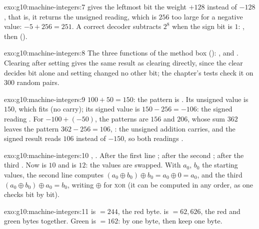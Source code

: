 \begin{solution}{exo:g10:machine-integers:7}
 gives the leftmost bit the weight $+128$ instead of $-128$, that is, it returns the unsigned
reading, which is $256$ too large for a negative value: $-5 + 256 = 251$. A correct decoder subtracts $2^8$ when the
sign bit is $1$: , then 
().
\end{solution}

\begin{solution}{exo:g10:machine-integers:8}
The three functions of the method box (): ,  and
. Clearing after setting gives the same result as clearing directly, since the clear decides bit
 alone and setting changed no other bit; the chapter's tests check it on $300$ random pairs.
\end{solution}

\begin{solution}{exo:g10:machine-integers:9}
$100 + 50 = 150$: the pattern is . Its unsigned value is $150$, which fits (no carry); its signed
value is $150 - 256 = -106$: the signed reading . For $-100 + (-50)$, the patterns are $156$ and $206$, whose
sum $362$ leaves the pattern $362 - 256 = 106$, : the unsigned addition carries, and the signed result
reads $106$ instead of $-150$, so both readings .
\end{solution}

\begin{solution}{exo:g10:machine-integers:10}
, . After the first line ; after the second
; after the third . Now  is $10$ and  is
$12$: the values are swapped. With $a_0$, $b_0$ the starting values, the second line computes
$(a_0 \oplus b_0) \oplus b_0 = a_0 \oplus 0 = a_0$, and the third $(a_0 \oplus b_0) \oplus a_0 = b_0$, writing
$\oplus$ for \textsc{xor} (it can be computed in any order, as one checks bit by bit).
\end{solution}

\begin{solution}{exo:g10:machine-integers:11}
 is  $= 244$, the red byte.  is  $= 62{,}626$, the red and
green bytes together. Green is  $= 162$:  by one byte, then keep one byte.
\end{solution}

